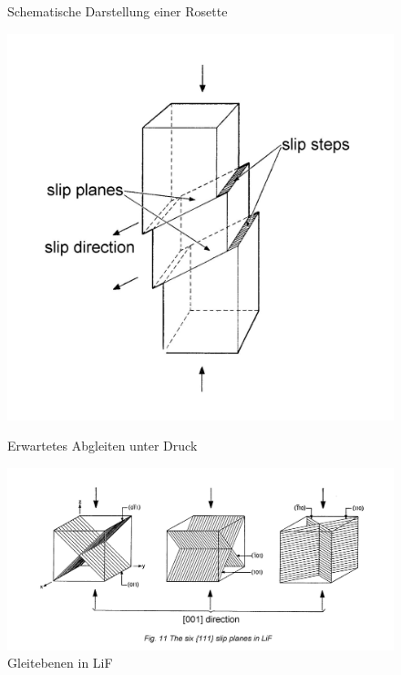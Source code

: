 \documentclass[12pt,a4paper]{scrartcl}
\numberwithin{equation}{section} %
\begin{document}
\begin{figure}[ht]
\begin{minipage}[t]{.3\linewidth}
		\caption{Schematische Darstellung einer Rosette \cite[S. 21]{Newey}}
		\label{abb:Schema Rosette}
	\end{minipage}
	\begin{minipage}[t]{.3\linewidth}
		\includegraphics[width=\textwidth]{../media/B2.8/Gleitsysteme_Druck.pdf}
		\caption{Erwartetes Abgleiten unter Druck \cite[S. 2]{Newey}}
		\label{abb:Gleitebene}
	\end{minipage}

	\begin{minipage}[t]{\linewidth}
		\centering
		\includegraphics[width=0.9\linewidth]{../media/B2.8/Gleitsysteme.pdf}
		\caption{Gleitebenen in LiF \cite[S. 9]{Newey} }
		\label{abb:Gleitebenen LiF}
	\end{minipage}
\end{figure}
\end{document}
